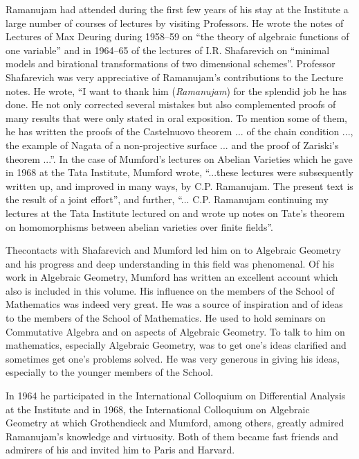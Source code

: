 Ramanujam had attended during the first few years of his stay at the 
Institute a large number of courses of lectures by visiting 
Professors. He wrote the notes of Lectures of Max Deuring during 
1958--59 on ``the theory of algebraic functions of one variable'' and 
in 1964--65 of the lectures of I.R. Shafarevich on ``minimal models 
and birational transformations of two dimensional schemes''. Professor 
Shafarevich was very appreciative of Ramanujam's contributions to the 
Lecture notes. He wrote, ``I want to thank him (\emph{Ramanujam}) for 
the splendid job he has done. He not only corrected several mistakes 
but also complemented proofs of many results that were only stated in 
oral exposition. To mention some of them, he has written the proofs of 
the Castelnuovo theorem ... of the chain condition ..., the example of 
Nagata of a non-projective surface ... and the proof of Zariski's 
theorem ...''. In the case of Mumford's lectures on Abelian Varieties 
which he gave in 1968 at the Tata Institute, Mumford wrote, ``...these 
lectures were subsequently written up, and improved in many ways, by 
C.P. Ramanujam. The present text is the result of a joint effort'', 
and further, ``... C.P. Ramanujam continuing my lectures at the Tata 
Institute lectured on and wrote up notes on Tate's theorem on 
homomorphisms between abelian varieties over finite fields''.  

The\pageoriginale contacts with Shafarevich and Mumford led him on to 
Algebraic Geometry and his progress and deep understanding in this 
field was phenomenal. Of his work in Algebraic Geometry, Mumford has 
written an excellent account which also is included in this volume. 
His influence on the members of the School of Mathematics was indeed 
very great. He was a source of inspiration and of ideas to the members 
of the School of Mathematics. He used to hold seminars on Commutative 
Algebra and on aspects of Algebraic Geometry. To talk to him on 
mathematics, especially Algebraic Geometry, was to get one's ideas 
clarified and sometimes get one's problems solved. He was very 
generous in giving his ideas, especially to the younger members of the 
School.

In 1964 he participated in the International Colloquium on 
Differential Analysis at the Institute and in 1968, the International 
Colloquium on Algebraic Geometry at which Grothendieck and Mumford, 
among others, greatly admired Ramanujam's knowledge and virtuosity. 
Both of them became fast friends and admirers of his and invited him 
to Paris and Harvard. 

